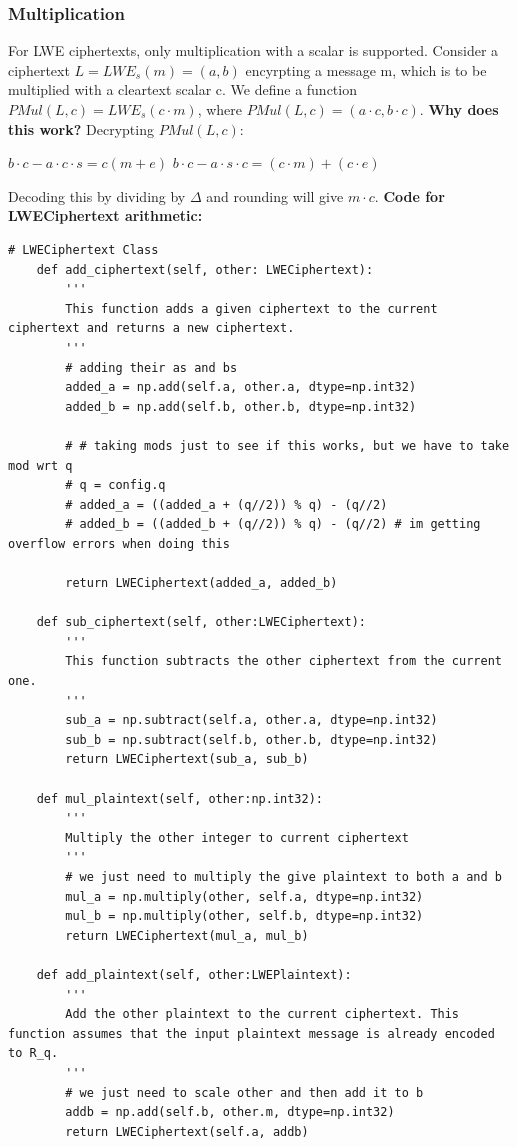 \documentclass{report}
\begin{document}
\subsubsection{Multiplication}
For LWE ciphertexts, only multiplication with a scalar is supported. Consider a ciphertext $L = LWE_s(m) = (a, b)$ encyrpting a message m, which is to be multiplied with a cleartext scalar c. We define a function $PMul(L, c) = LWE_s(c \cdot m)$, where $PMul(L, c) = (a \cdot c, b \cdot c)$.  \newline
\textbf{Why does this work?} \newline
Decrypting $PMul(L, c)$:
\begin{center}
	$b \cdot c - a \cdot c \cdot s = c ( m + e )$ \newline
	$b \cdot c - a \cdot s \cdot c = (c \cdot m) + (c \cdot e) $
\end{center}
Decoding this by dividing by $\Delta$ and rounding  will give $m \cdot c$.
\textbf{Code for LWECiphertext arithmetic:}
\begin{verbatim}
# LWECiphertext Class
	def add_ciphertext(self, other: LWECiphertext):
		'''
		This function adds a given ciphertext to the current ciphertext and returns a new ciphertext.
		'''
		# adding their as and bs
		added_a = np.add(self.a, other.a, dtype=np.int32)
		added_b = np.add(self.b, other.b, dtype=np.int32)
	
		# # taking mods just to see if this works, but we have to take mod wrt q
		# q = config.q
		# added_a = ((added_a + (q//2)) % q) - (q//2)
		# added_b = ((added_b + (q//2)) % q) - (q//2) # im getting overflow errors when doing this
		
		return LWECiphertext(added_a, added_b)
		
	def sub_ciphertext(self, other:LWECiphertext):
		'''
		This function subtracts the other ciphertext from the current one.
		'''
		sub_a = np.subtract(self.a, other.a, dtype=np.int32)
		sub_b = np.subtract(self.b, other.b, dtype=np.int32)
		return LWECiphertext(sub_a, sub_b)
	
	def mul_plaintext(self, other:np.int32):
		'''
		Multiply the other integer to current ciphertext
		'''
		# we just need to multiply the give plaintext to both a and b
		mul_a = np.multiply(other, self.a, dtype=np.int32)
		mul_b = np.multiply(other, self.b, dtype=np.int32)
		return LWECiphertext(mul_a, mul_b)
	
	def add_plaintext(self, other:LWEPlaintext):
		'''
		Add the other plaintext to the current ciphertext. This function assumes that the input plaintext message is already encoded to R_q.
		'''
		# we just need to scale other and then add it to b
		addb = np.add(self.b, other.m, dtype=np.int32)
		return LWECiphertext(self.a, addb)
\end{verbatim}
\end{document}
